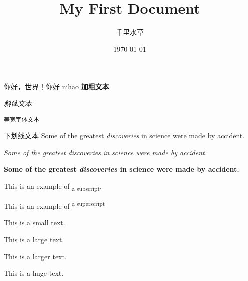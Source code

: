 \documentclass[UTF8,12pt,letterpaper]{ctexart}\title{My First Document}
\author{千里水草}
\date{\today}
\begin{document}
\maketitle
你好，世界！你好
nihao
\textbf{加粗文本}

\textit{斜体文本}

\texttt{等宽字体文本}

\underline{下划线文本}
Some of the greatest \emph{discoveries} in science 
were made by accident.

\textit{Some of the greatest \emph{discoveries} 
in science were made by accident.}

\textbf{Some of the greatest \emph{discoveries} 
in science were made by accident.}

This is an example of \textsubscript{a subscript}.

This is an example of \textsuperscript{a superscript}

\small{This is a small text.}

{\large This is a large text.}

{\Large This is a larger text.}

{\huge This is a huge text.}
\end{document}

